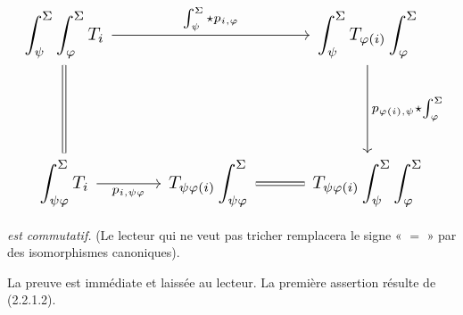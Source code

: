 \begin{equation*}
  \resizebox{\textwidth}{!}{%
    $\begin{tikzcd}[ampersand replacement=\&,column sep=2.8em,row sep=5.0em]
      \displaystyle\int_\psi^\Sigma\int_\varphi^\Sigma T_i
        \arrow[rr,"{\int_\psi^\Sigma\star p_{i,\varphi}}"]
        \arrow[d,equal]
        \& {}
        \& \displaystyle\int_\psi^\Sigma T_{\varphi(i)}\int_\varphi^\Sigma
          \arrow[d,"{p_{\varphi(i),\psi}\star\int_\varphi^\Sigma}"] \\
      \displaystyle\int_{\psi\varphi}^\Sigma T_i
        \arrow[r,"{p_{i,\psi\varphi}}"']
        \& \displaystyle T_{\psi\varphi(i)}\int_{\psi\varphi}^\Sigma
          \arrow[r,equal]
        \& \displaystyle T_{\psi\varphi(i)}\int_\psi^\Sigma\int_\varphi^\Sigma
    \end{tikzcd}$%
  }
\end{equation*}

\emph{est commutatif.} (Le lecteur qui ne veut pas tricher remplacera le
signe « $=$ » par des isomorphismes canoniques).

La preuve est immédiate et laissée au lecteur. La première assertion
résulte de (2.2.1.2).
